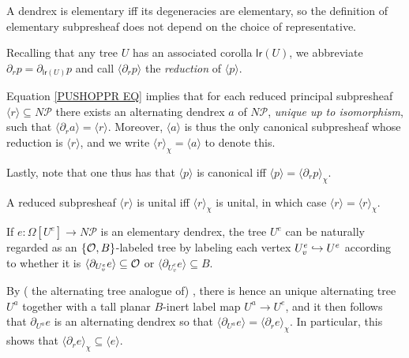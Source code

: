 \documentclass[a4paper,10pt
,draft
]{article}%
\renewcommand{\1}{\eta}%
\begin{document}
\begin{remark}
A dendrex is elementary iff its degeneracies are elementary,
so the definition of elementary subpresheaf does not depend on the choice of representative.
\end{remark}


\begin{notation}
Recalling that any tree $U$
has an associated corolla $\mathsf{lr}(U)$, 
we abbreviate
$\partial_r p = \partial_{\mathsf{lr}(U)}p$
and call
$\langle \partial_r p \rangle$
the \emph{reduction} of  
$\langle p \rangle$.
\end{notation}




\begin{remark}\label{PUSHOPPRRST REM}
Equation \eqref{PUSHOPPR EQ} 
implies
that for each reduced principal subpresheaf
$\langle r \rangle \subseteq N \mathcal{P}$
there exists an alternating dendrex $a$ of $N \mathcal P$, 
\emph{unique up to isomorphism}, 
such that
$\langle \partial_r a \rangle = \langle r \rangle$.
%
Moreover, $\langle a \rangle$ is thus the only canonical subpresheaf whose reduction is 
$\langle r \rangle$,
and we write
$\langle r \rangle_{\chi} = \langle a \rangle$
to denote this.

Lastly, note that one thus has that 
$\langle p \rangle$ is canonical iff
$\langle p \rangle = \langle \partial_r p \rangle_{\chi}$.
\end{remark}


\begin{remark}\label{UNITALCASE REM}
A reduced subpresheaf $\langle r \rangle$
is unital iff 
$\langle r \rangle_{\chi}$ is unital, in which case
$\langle r \rangle = \langle r \rangle_{\chi}$.
\end{remark}



\begin{remark}\label{ELEMLABEL REM}
If $e \colon \Omega[U^e] \to N \mathcal{P}$
is an elementary dendrex, 
the tree $U^e$ can be naturally regarded as an
$\{\mathcal{O},B\}$-labeled tree by labeling each vertex $U^e_v \hookrightarrow U^e$ according to whether
it is $\langle \partial_{U^e_v} e\rangle \subseteq \mathcal{O} $ or
$\langle \partial_{U^e_v} e\rangle \subseteq B$.

By ({\color{blue} the alternating tree analogue of})
\cite[Prop. 5.48]{BP_geo}, there is hence an unique alternating tree $U^a$ together with a tall planar $B$-inert label map $U^a \to U^e$,
and it then follows that
$\partial_{U^a} e$ is an alternating dendrex so that
$\langle \partial_{U^a} e \rangle = \langle \partial_r e \rangle_{\chi}$.
%
In particular, this shows that
$\langle \partial_r e \rangle_{\chi} \subseteq 
\langle e \rangle$.
\end{remark}
\end{document}
